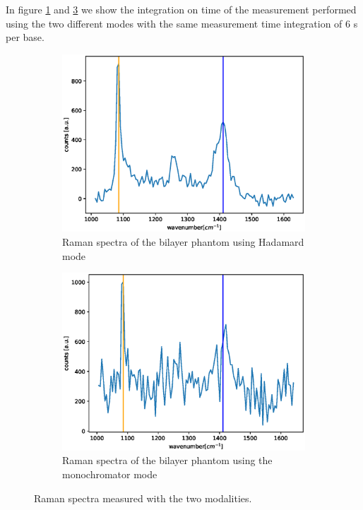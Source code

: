 \documentclass{osa-article}
\begin{document}
In figure \ref{fig:had_bi} and \ref{fig:mono_bi} we show the integration on time of the measurement performed using the two different modes with the same measurement time integration of 6 s per base. 
\begin{figure}
    \begin{subfigure}{0.5\linewidth}
        \centering
        \includegraphics[scale = 0.4]{figure/spectra_had.eps}
        \caption{Raman spectra of the bilayer phantom using Hadamard mode}
        \label{fig:had_bi}
    \end{subfigure}
    \begin{subfigure}{0.5\linewidth}
        \centering
        \includegraphics[scale = 0.4]{figure/spectra_mono.eps}
        \caption{Raman spectra of the bilayer phantom using the monochromator mode}
        \label{fig:mono_bi}
    \end{subfigure}
    \caption{Raman spectra measured with the two modalities.}
\end{figure}
\end{document}
